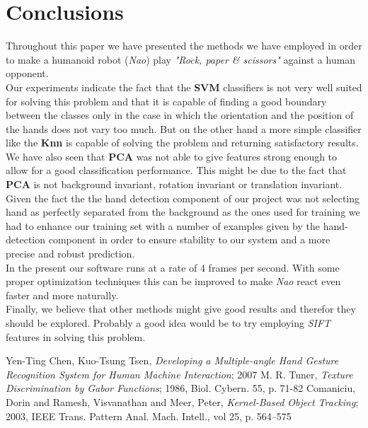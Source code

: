 \documentclass[a4paper, 11pt, twocolumn]{article}
\begin{document}
    \section{Conclusions}
	\label{sec:conclusion}
		Throughout this paper we have presented the methods we have employed in order to make a humanoid robot (\emph{Nao}) play \emph{"Rock, paper \& scissors"} against a human opponent.\\
 		\hspace*{10px}Our experiments indicate the fact that the \textbf{SVM} classifiers is not very well suited for solving this problem and that it is capable of finding a good boundary between the classes only in the case in which the orientation and the position of the hands does not vary too much. But on the other hand a more simple classifier like the \textbf{Knn} is capable of solving the problem and returning satisfactory results.\\
		\hspace*{10px}We have also seen that \textbf{PCA} was not able to give features strong enough to allow for a good classification performance. This might be due to the fact that \textbf{PCA} is not background invariant, rotation invariant or translation invariant.\\
		\hspace*{10px}Given the fact the the hand detection component of our project was not selecting hand as perfectly separated from the background as the ones used for training we had to enhance our training set with a number of examples given by the hand-detection component in order to ensure stability to our system and a more precise and robust prediction.\\
		\hspace*{10px}In the present our software runs at a rate of 4 frames per second. With some proper optimization techniques this can be improved to make \emph{Nao} react even faster and more naturally.\\
		\hspace*{10px}Finally, we believe that other methods might give good results and therefor they should be explored. Probably a good idea would be to try employing \emph{SIFT} features in solving this problem.
	\begin{thebibliography}{2}
		Yen-Ting Chen, Kuo-Tsung Tsen, \emph{Developing a Multiple-angle Hand Gesture Recognition System for Human Machine Interaction}; 2007
		M. R. Tuner, \emph{Texture Discrimination by Gabor Functions}; 1986, Biol. Cybern. 55, p. 71-82 
		Comaniciu, Dorin and Ramesh, Visvanathan and Meer, Peter, \emph{Kernel-Based Object Tracking}; 2003, IEEE Trans. Pattern Anal. Mach. Intell., vol 25, p. 564--575
	\end{thebibliography}    
\end{document}
